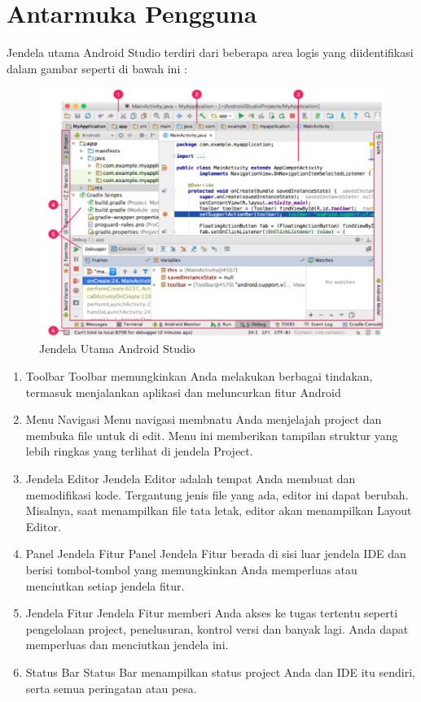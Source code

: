 \section{Antarmuka Pengguna}
\hfill \break
Jendela utama Android Studio terdiri dari beberapa area logis yang diidentifikasi dalam gambar seperti di bawah ini :
\begin{figure}[!htbp]
  \centering
  \includegraphics[width=.75\textwidth]{figures/JU.png}
  \caption{Jendela Utama Android Studio}\label{fig:error}
\end{figure}
\begin{enumerate}
\item Toolbar
\hfill \break
Toolbar memungkinkan Anda melakukan berbagai tindakan, termasuk menjalankan aplikasi dan meluncurkan fitur Android
\item Menu Navigasi
\hfill \break
Menu navigasi membnatu Anda menjelajah project dan membuka file untuk di edit. Menu ini memberikan tampilan struktur yang lebih ringkas yang terlihat di jendela Project.
\item Jendela Editor
\hfill \break
Jendela Editor adalah tempat Anda membuat dan memodifikasi kode. Tergantung jenis file yang ada, editor ini dapat berubah. Misalnya, saat menampilkan file tata letak, editor akan menampilkan Layout Editor.
\item Panel Jendela Fitur
\hfill \break
Panel Jendela Fitur berada di sisi luar jendela IDE dan berisi tombol-tombol yang memungkinkan Anda memperluas atau menciutkan setiap jendela fitur.
\item Jendela Fitur
\hfill \break
Jendela Fitur memberi Anda akses ke tugas tertentu seperti pengelolaan project, penelusuran, kontrol versi dan banyak lagi. Anda dapat memperluas dan menciutkan jendela ini.
\item Status Bar
\hfill \break
Status Bar menampilkan status project Anda dan IDE itu sendiri, serta semua peringatan atau pesa.
\end{enumerate}

